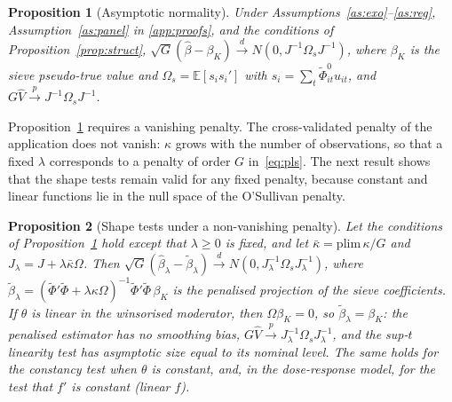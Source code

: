 \documentclass[pdflatex,sn-basic]{sn-jnl}%
\theoremstyle{thmstyleone}
\newtheorem{proposition}{Proposition}
\theoremstyle{thmstyletwo}
\newcommand{\E}{\mathbb{E}}
\begin{document}
\begin{proposition}[Asymptotic normality]\label{prop:an}
Under Assumptions~\ref{as:exo}--\ref{as:reg}, Assumption~\ref{as:panel} in \ref{app:proofs}, and the conditions of Proposition~\ref{prop:struct}, $\sqrt G(\hat\beta-\beta_K)\xrightarrow{d}N(0,J^{-1}\Omega_s J^{-1})$, where $\beta_K$ is the sieve pseudo-true value and $\Omega_s=\E[s_is_i']$ with $s_i=\sum_t\tilde\Phi^0_{it}u_{it}$, and $G\hat V\xrightarrow{p}J^{-1}\Omega_s J^{-1}$.
\end{proposition}

Proposition~\ref{prop:an} requires a vanishing penalty. The cross-validated penalty of the application does not vanish: $\kappa$ grows with the number of observations, so that a fixed $\lambda$ corresponds to a penalty of order $G$ in~\eqref{eq:pls}. The next result shows that the shape tests remain valid for any fixed penalty, because constant and linear functions lie in the null space of the O'Sullivan penalty.

\begin{proposition}[Shape tests under a non-vanishing penalty]\label{prop:null}
Let the conditions of Proposition~\ref{prop:an} hold except that $\lambda\ge0$ is fixed, and let $\bar\kappa=\mathrm{plim}\,\kappa/G$ and $J_\lambda=J+\lambda\bar\kappa\Omega$. Then $\sqrt G(\hat\beta_\lambda-\tilde\beta_\lambda)\xrightarrow{d}N(0,J_\lambda^{-1}\Omega_sJ_\lambda^{-1})$, where $\tilde\beta_\lambda=(\tilde\Phi'\tilde\Phi+\lambda\kappa\Omega)^{-1}\tilde\Phi'\tilde\Phi\,\beta_K$ is the penalised projection of the sieve coefficients. If $\theta$ is linear in the winsorised moderator, then $\Omega\beta_K=0$, so $\tilde\beta_\lambda=\beta_K$: the penalised estimator has no smoothing bias, $G\hat V\xrightarrow{p}J_\lambda^{-1}\Omega_sJ_\lambda^{-1}$, and the sup-$t$ linearity test has asymptotic size equal to its nominal level. The same holds for the constancy test when $\theta$ is constant, and, in the dose-response model, for the test that $f'$ is constant (linear $f$).
\end{proposition}
\end{document}
